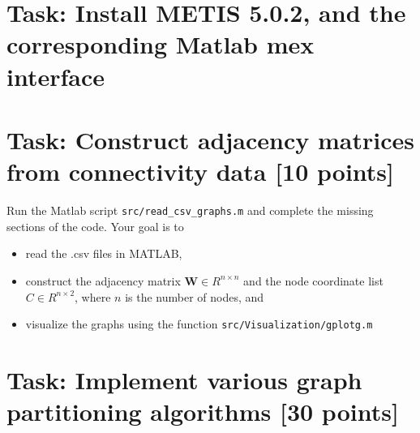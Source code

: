 \documentclass[unicode,11pt,a4paper,oneside,numbers=endperiod,openany]{scrartcl}
\begin{document}
\setassignment
{}

\newline

\assignmentpolicy

\section{Task: Install METIS 5.0.2, and the corresponding Matlab mex interface}


\section{Task:  Construct adjacency matrices
from connectivity data [10 points]}


Run the Matlab script
\texttt{src/read\_csv\_graphs.m} and complete
the
missing sections of the code. Your goal is to
\begin{itemize}
    \item read the .csv files in MATLAB,
    \item construct the adjacency matrix
    $\mathbf{W} \in R^{n\times n}$ and
    the node coordinate list $C \in
    R^{n\times 2}$, where $n$ is the number of nodes, and 
    \item visualize the graphs using the
    function
    \texttt{src/Visualization/gplotg.m}
\end{itemize}


\section{Task: Implement various graph partitioning algorithms [30 points]}
\end{document}
